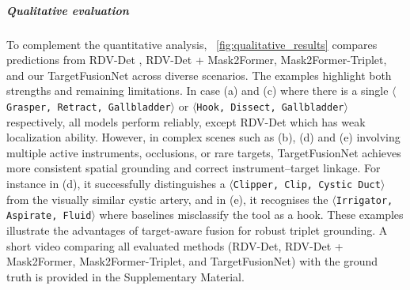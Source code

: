 \documentclass[pdflatex,sn-mathphys-num]{sn-jnl}%
\newcommand{\triplet}[3]{\texttt{$\langle$#1, #2, #3$\rangle$}\xspace}
\newcommand{\figref}[1]{\figurename~\ref{#1}}
\newcommand{\mysubsection}[1]{\subparagraph{#1}}
\theoremstyle{thmstyleone}%
\theoremstyle{thmstyletwo}%
\theoremstyle{thmstylethree}%
\begin{document}
\mysubsection{Qualitative evaluation}
\label{sec:qualitative}
To complement the quantitative analysis, \figref{fig:qualitative_results} compares predictions from RDV-Det \cite{nwoye2022rendezvous}, RDV-Det + Mask2Former, Mask2Former-Triplet, and our TargetFusionNet across diverse scenarios. The examples highlight both strengths and remaining limitations. In case (a) and (c) where there is  a single \triplet{Grasper}{Retract}{Gallbladder} or \triplet{Hook}{Dissect}{Gallbladder} respectively, all models perform reliably, except RDV-Det which has weak localization ability. However, in complex scenes such as (b), (d) and (e) involving multiple active instruments, occlusions, or rare targets, TargetFusionNet achieves more consistent spatial grounding and correct instrument–target linkage. For instance in (d), it successfully distinguishes a \triplet{Clipper}{Clip}{Cystic Duct} from the visually similar cystic artery, and in (e), it recognises the  \triplet{Irrigator}{Aspirate}{Fluid} where baselines misclassify the tool as a hook. These examples illustrate the advantages of target-aware fusion for robust triplet grounding.
A short video comparing all evaluated methods (RDV-Det, RDV-Det + Mask2Former, Mask2Former-Triplet, and TargetFusionNet) with the ground truth is provided in the Supplementary Material.
\end{document}
